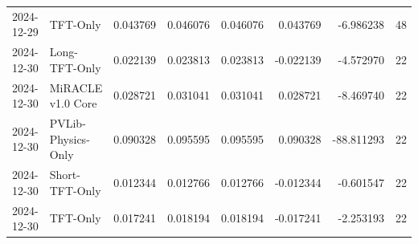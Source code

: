 \begin{tabular}{llrrrrrr}
2024-12-29 & TFT-Only & 0.043769 & 0.046076 & 0.046076 & 0.043769 & -6.986238 & 48 \\
2024-12-30 & Long-TFT-Only & 0.022139 & 0.023813 & 0.023813 & -0.022139 & -4.572970 & 22 \\
2024-12-30 & MiRACLE v1.0 Core & 0.028721 & 0.031041 & 0.031041 & 0.028721 & -8.469740 & 22 \\
2024-12-30 & PVLib-Physics-Only & 0.090328 & 0.095595 & 0.095595 & 0.090328 & -88.811293 & 22 \\
2024-12-30 & Short-TFT-Only & 0.012344 & 0.012766 & 0.012766 & -0.012344 & -0.601547 & 22 \\
2024-12-30 & TFT-Only & 0.017241 & 0.018194 & 0.018194 & -0.017241 & -2.253193 & 22 \\
\bottomrule
\end{tabular}
